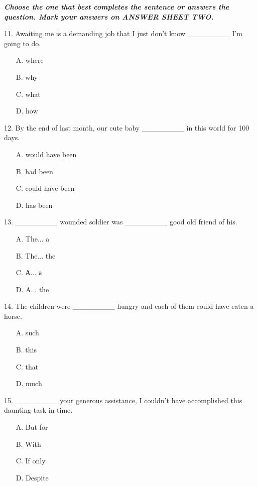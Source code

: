 \documentclass[UTF8,11pt]{ctexart}
\begin{document}
\textbf{\textit{Choose the one that best completes the sentence or answers the question. Mark your answers on ANSWER SHEET TWO.}}


11. Awaiting me is a demanding job that I just don’t know \_\_\_\_\_\_\_\_ I’m going to do.


\begin{itemize}[leftmargin=2em,itemsep=.2em,topsep=.4em]\item[A.] where
\item[B.] why
\item[C.] what
\item[D.] how
\end{itemize}

12. By the end of last month, our cute baby \_\_\_\_\_\_\_\_ in this world for 100 days.


\begin{itemize}[leftmargin=2em,itemsep=.2em,topsep=.4em]\item[A.] would have been
\item[B.] had been
\item[C.] could have been
\item[D.] has been
\end{itemize}

13. \_\_\_\_\_\_\_\_ wounded soldier was \_\_\_\_\_\_\_\_ good old friend of his.


\begin{itemize}[leftmargin=2em,itemsep=.2em,topsep=.4em]\item[A.] The... a
\item[B.] The... the
\item[C.] {А}... {а}
\item[D.] A... the
\end{itemize}

14. The children were \_\_\_\_\_\_\_\_ hungry and each of them could have eaten a horse.


\begin{itemize}[leftmargin=2em,itemsep=.2em,topsep=.4em]\item[A.] such
\item[B.] this
\item[C.] that
\item[D.] much
\end{itemize}

15. \_\_\_\_\_\_\_\_ your generous assistance, I couldn’t have accomplished this daunting task in time.


\begin{itemize}[leftmargin=2em,itemsep=.2em,topsep=.4em]\item[A.] But for
\item[B.] With
\item[C.] If only
\item[D.] Despite
\end{itemize}
\end{document}
